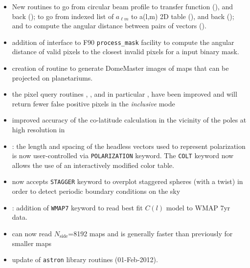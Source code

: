 \documentclass[12pt,twoside]{article}
\newcommand{\nside}{N_{\mathrm{side}}}
\newcommand{\linklatexhtml}[3]{%
\latexhtml{\htmladdnormallink{#1}{#2}}{\htmladdnormallink{#1}{#3}}}
\begin{document}
{{\tinysubsubsection*{\linklatexhtml{IDL}{idl.pdf}{idl.htm}}
\begin{itemize}
	\setlength{\itemsep}{0pt}
	\setlength{\parsep}{0pt}
	\item New routines to go from circular beam profile to transfer function
(), 
and back (); 
to go from indexed list of $a_{\ell m}$ to a(l,m) 2D table
(), 
and back
(); and to compute the angular distance
between pairs of vectors ().
%
	\item addition of 
interface to F90 {\tt process\_mask} facility to compute the angular distance of valid
pixels to the closest invalid pixels for a input binary mask.
%
	\item creation of  routine to generate
DomeMaster images of \healpix maps that can be projected on planetariums.
%
	\item the pixel query routines 
, 
, 
and in particular , 
have been improved and will return fewer
false positive pixels in the {\em inclusive} mode
%
	\item improved accuracy of the co-latitude calculation in the vicinity
of the poles at high resolution in 
%
	\item {}:
 the length and spacing of the headless vectors used to represent
polarization is now user-controlled  via 
{\tt POLARIZATION}
keyword. The {\tt COLT} keyword now
allows the use of an interactively modified color table.
%
	\item {} now accepts
{\tt STAGGER} keyword to overplot staggered
spheres (with a twist) in order to detect periodic boundary conditions on the
sky
	\item {}: addition of {{\tt WMAP7}} keyword
to read best fit $C(l)$ model to WMAP 7yr data.
	\item {} can now read
$\nside$=8192 \healpix maps and is generally faster than previously for smaller
maps
	\item update of {\tt astron} library routines (01-Feb-2012).
\end{itemize}

}}
\end{document}
